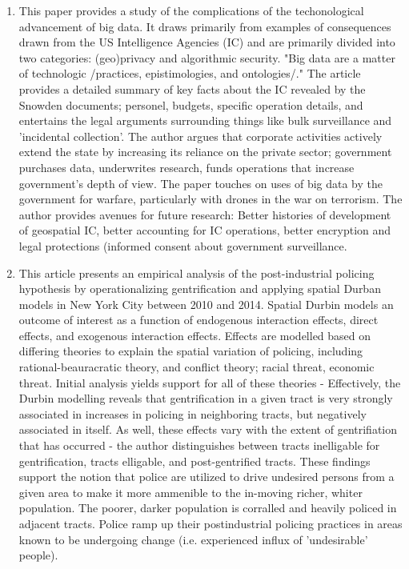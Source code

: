 \documentclass{article}
\begin{document}
\begin{enumerate}
\item \cite{crampton2015CollectIt}

This paper provides a study of the complications of the techonological
advancement of big data. It draws primarily from examples of
consequences drawn from the US Intelligence Agencies (IC) and are
primarily divided into two categories: (geo)privacy and algorithmic
security. "Big data are a matter of technologic /practices,
epistimologies, and ontologies/." The article provides a detailed
summary of key facts about the IC revealed by the Snowden documents;
personel, budgets, specific operation details, and entertains the
legal arguments surrounding things like bulk surveillance and
'incidental collection'. The author argues that corporate activities
actively extend the state by increasing its reliance on the private
sector; government purchases data, underwrites research, funds
operations that increase government's depth of view. The paper touches
on uses of big data by the government for warfare, particularly with
drones in the war on terrorism. The author provides avenues for future
research: Better histories of development of geospatial IC, better
accounting for IC operations, better encryption and legal protections
(informed consent about government surveillance.


\item \cite{laniyonu2018CoffeeShops}

This article presents an empirical analysis of the post-industrial
policing hypothesis by operationalizing gentrification and applying
spatial Durban models in New York City between 2010 and 2014. Spatial
Durbin models an outcome of interest as a function of endogenous
interaction effects, direct effects, and exogenous interaction
effects. Effects are modelled based on differing theories to explain
the spatial variation of policing, including rational-beauracratic
theory, and conflict theory; racial threat, economic threat. Initial
analysis yields support for all of these theories - Effectively, the
Durbin modelling reveals that gentrification in a given tract is very
strongly associated in increases in policing in neighboring tracts,
but negatively associated in itself. As well, these effects vary with
the extent of gentrifiation that has occurred - the author
distinguishes between tracts inelligable for gentrification, tracts
elligable, and post-gentrified tracts. These findings support the
notion that police are utilized to drive undesired persons from a
given area to make it more ammenible to the in-moving richer, whiter
population. The poorer, darker population is corralled and heavily
policed in adjacent tracts. Police ramp up their postindustrial
policing practices in areas known to be undergoing change
(i.e. experienced influx of 'undesirable' people).



\end{enumerate}
\end{document}
